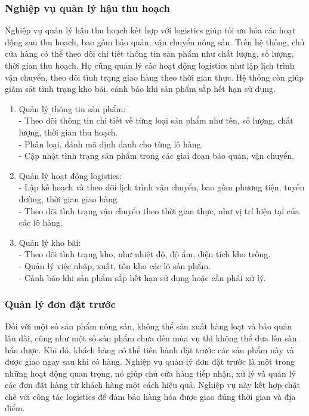         \subsubsection{Nghiệp vụ quản lý hậu thu hoạch}
        Nghiệp vụ quản lý hậu thu hoạch kết hợp với logistics giúp tối ưu hóa các hoạt động sau thu hoạch, bao gồm bảo quản, vận chuyển nông sản. Trên hệ thống, chủ cửa hàng có thể theo dõi chi tiết thông tin sản phẩm như chất lượng, số lượng, thời gian thu hoạch. Họ cũng quản lý các hoạt động logistics như lập lịch trình vận chuyển, theo dõi tình trạng giao hàng theo thời gian thực. Hệ thống còn giúp giám sát tình trạng kho bãi, cảnh báo khi sản phẩm sắp hết hạn sử dụng. 
        \begin{enumerate}
            \item Quản lý thông tin sản phẩm:\\
                - Theo dõi thông tin chi tiết về từng loại sản phẩm như tên, số lượng, chất lượng, thời gian thu hoạch.\\
                - Phân loại, đánh mã định danh cho từng lô hàng.\\
                - Cập nhật tình trạng sản phẩm trong các giai đoạn bảo quản, vận chuyển.\\
            \item Quản lý hoạt động logistics:\\
                - Lập kế hoạch và theo dõi lịch trình vận chuyển, bao gồm phương tiện, tuyến đường, thời gian giao hàng.\\
                - Theo dõi tình trạng vận chuyển theo thời gian thực, như vị trí hiện tại của các lô hàng.\\
            \item Quản lý kho bãi:\\
                - Theo dõi tình trạng kho, như nhiệt độ, độ ẩm, diện tích kho trống.\\
                - Quản lý việc nhập, xuất, tồn kho các lô sản phẩm.\\
                - Cảnh báo khi sản phẩm sắp hết hạn sử dụng hoặc cần phải xử lý.\\
        \end{enumerate}

        \subsubsection{Quản lý đơn đặt trước}
        Đối với một số sản phẩm nông sản, không thể sản xuất hàng loạt và bảo quản lâu dài, cũng như một số sản phẩm chưa đến mùa vụ thì không thể đưa lên sàn bán được. Khi đó, khách hàng có thể tiến hành đặt trước các sản phẩm này và được giao ngay sau khi có hàng. Nghiệp vụ quản lý đơn đặt trước là một trong những hoạt động quan trọng, nó giúp chủ cửa hàng tiếp nhận, xử lý và quản lý các đơn đặt hàng từ khách hàng một cách hiệu quả. Nghiệp vụ này kết hợp chặt chẽ với công tác logistics để đảm bảo hàng hóa được giao đúng thời gian và địa điểm.

